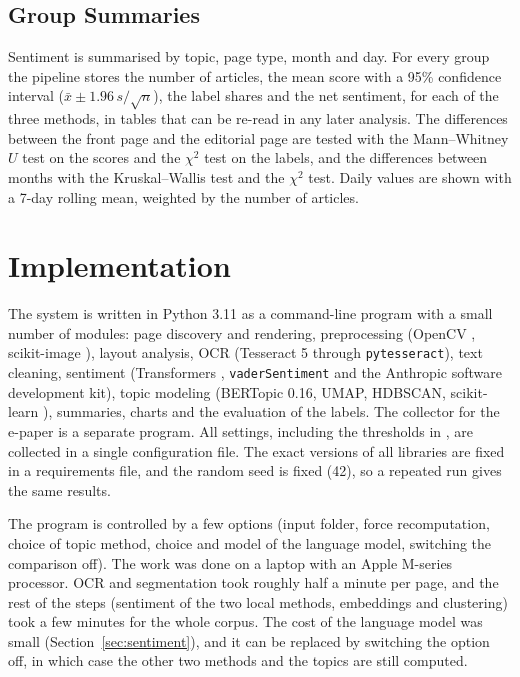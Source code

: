 \subsection{Group Summaries}
Sentiment is summarised by topic, page type, month and day. For every group the pipeline stores the number of articles, the mean score with a 95\% confidence interval ($\bar x \pm 1.96\,s/\sqrt{n}$), the label shares and the net sentiment, for each of the three methods, in tables that can be re-read in any later analysis. The differences between the front page and the editorial page are tested with the Mann--Whitney $U$ test on the scores and the $\chi^2$ test on the labels, and the differences between months with the Kruskal--Wallis test and the $\chi^2$ test. Daily values are shown with a 7-day rolling mean, weighted by the number of articles.

\section{Implementation}
\label{sec:implementation}

The system is written in Python 3.11 as a command-line program with a small number of modules: page discovery and rendering, preprocessing (OpenCV \cite{bradski2000}, scikit-image \cite{vanderwalt2014}), layout analysis, OCR (Tesseract 5 through \texttt{pytesseract}), text cleaning, sentiment (Transformers \cite{wolf2020}, \texttt{vaderSentiment} and the Anthropic software development kit), topic modeling (BERTopic 0.16, UMAP, HDBSCAN, scikit-learn \cite{pedregosa2011}), summaries, charts and the evaluation of the labels. The collector for the e-paper is a separate program. All settings, including the thresholds in , are collected in a single configuration file. The exact versions of all libraries are fixed in a requirements file, and the random seed is fixed (42), so a repeated run gives the same results.

The program is controlled by a few options (input folder, force recomputation, choice of topic method, choice and model of the language model, switching the comparison off). The work was done on a laptop with an Apple M-series processor. OCR and segmentation took roughly half a minute per page, and the rest of the steps (sentiment of the two local methods, embeddings and clustering) took a few minutes for the whole corpus. The cost of the language model was small (Section~\ref{sec:sentiment}), and it can be replaced by switching the option off, in which case the other two methods and the topics are still computed.
